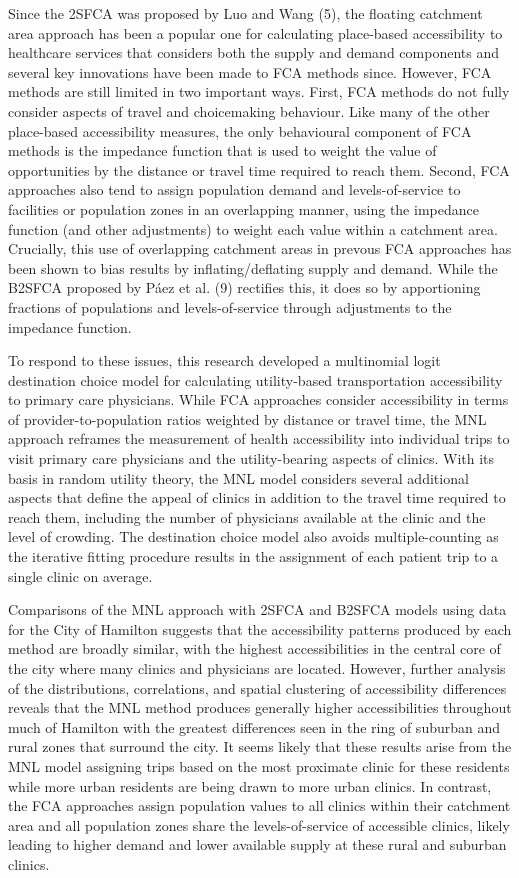 \documentclass{article}
\begin{document}
Since the 2SFCA was proposed by Luo and Wang (5), the floating catchment
area approach has been a popular one for calculating place-based
accessibility to healthcare services that considers both the supply and
demand components and several key innovations have been made to FCA
methods since. However, FCA methods are still limited in two important
ways. First, FCA methods do not fully consider aspects of travel and
choicemaking behaviour. Like many of the other place-based accessibility
measures, the only behavioural component of FCA methods is the impedance
function that is used to weight the value of opportunities by the
distance or travel time required to reach them. Second, FCA approaches
also tend to assign population demand and levels-of-service to
facilities or population zones in an overlapping manner, using the
impedance function (and other adjustments) to weight each value within a
catchment area. Crucially, this use of overlapping catchment areas in
prevous FCA approaches has been shown to bias results by
inflating/deflating supply and demand. While the B2SFCA proposed by Páez
et al. (9) rectifies this, it does so by apportioning fractions of
populations and levels-of-service through adjustments to the impedance
function.

To respond to these issues, this research developed a multinomial logit
destination choice model for calculating utility-based transportation
accessibility to primary care physicians. While FCA approaches consider
accessibility in terms of provider-to-population ratios weighted by
distance or travel time, the MNL approach reframes the measurement of
health accessibility into individual trips to visit primary care
physicians and the utility-bearing aspects of clinics. With its basis in
random utility theory, the MNL model considers several additional
aspects that define the appeal of clinics in addition to the travel time
required to reach them, including the number of physicians available at
the clinic and the level of crowding. The destination choice model also
avoids multiple-counting as the iterative fitting procedure results in
the assignment of each patient trip to a single clinic on average.

Comparisons of the MNL approach with 2SFCA and B2SFCA models using data
for the City of Hamilton suggests that the accessibility patterns
produced by each method are broadly similar, with the highest
accessibilities in the central core of the city where many clinics and
physicians are located. However, further analysis of the distributions,
correlations, and spatial clustering of accessibility differences
reveals that the MNL method produces generally higher accessibilities
throughout much of Hamilton with the greatest differences seen in the
ring of suburban and rural zones that surround the city. It seems likely
that these results arise from the MNL model assigning trips based on the
most proximate clinic for these residents while more urban residents are
being drawn to more urban clinics. In contrast, the FCA approaches
assign population values to all clinics within their catchment area and
all population zones share the levels-of-service of accessible clinics,
likely leading to higher demand and lower available supply at these
rural and suburban clinics.
\end{document}
